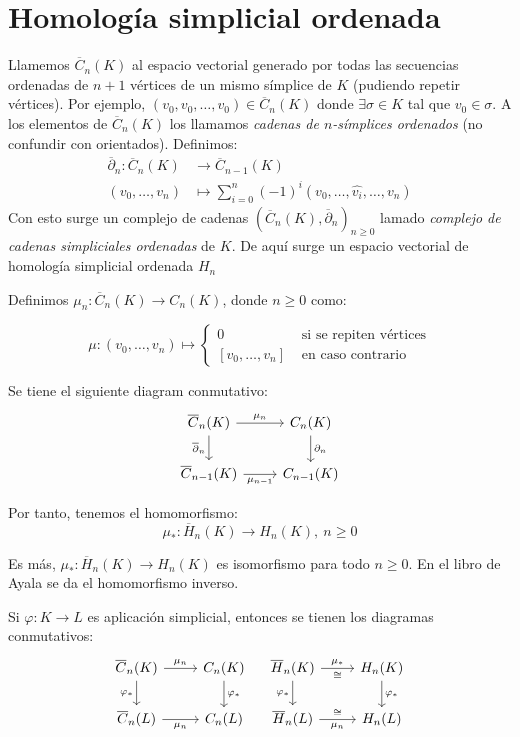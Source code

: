 \documentclass[HS.tex]{subfiles}
\begin{document}
\section{Homología simplicial ordenada}

Llamemos $\overline{C}_n(K)$ al espacio vectorial generado por todas las secuencias ordenadas de $n+1$ vértices de un mismo símplice de $K$ (pudiendo repetir vértices).
Por ejemplo, $(v_0,v_0,\dots,v_0) \in \overline{C}_n(K)$ donde $\exists \sigma \in K$ tal que $v_0 \in \sigma$.
A los elementos de $\overline{C}_n(K)$ los llamamos \emph{cadenas de $n$-símplices ordenados} (no confundir con orientados).
Definimos:
\begin{align*}
	\overline{\partial}_n \colon \overline{C}_n(K) & \to \overline{C}_{n-1}(K)\\
	(v_0,\dots,v_n) & \mapsto \sum_{i=0}^n (-1)^i(v_0,\dots,\widehat{v_i},\dots,v_n)
\end{align*}
Con esto surge un complejo de cadenas $(\overline{C}_n(K), \overline{\partial}_n)_{n \geq 0}$ lamado \emph{complejo de cadenas simpliciales ordenadas} de $K$.
De aquí surge un espacio vectorial de homología simplicial ordenada $H_n$

Definimos $\mu_n \colon \overline{C}_n(K) \to C_n(K)$, donde $n \geq 0$ como:

\[ \mu \colon (v_0,\dots,v_n) \mapsto \begin{cases}0 & \text{ si se repiten vértices}\\ [v_0,\dots,v_n] & \text{ en caso contrario}\end{cases}\]

\begin{propi}\mbox{}
Se tiene el siguiente diagram conmutativo:
\[\begin{tikzcd}{\overline{C}_n(K)} \arrow[r,"\mu_n"] \arrow[d,"\overline{\partial}_n" left] & {C_n(K)} \arrow[d,"\partial_n"]\\
{\overline{C}_{n-1}(K)} \arrow[r,"\mu_{n-1}" below] & C_{n-1}(K)
\end{tikzcd}\]

Por tanto, tenemos el homomorfismo:
\[ \mu_* \colon \overline{H}_n(K) \to H_n(K),\ n\geq 0\]

Es más, $\mu_* \colon \overline{H}_n(K) \to H_n(K)$ es isomorfismo para todo $n \geq 0$.
En el libro de Ayala se da el homomorfismo inverso.
\end{propi}

\begin{propi}
Si $\varphi \colon K \to L$ es aplicación simplicial, entonces se tienen los diagramas conmutativos:
\[\begin{tikzcd}{\overline{C}_n(K)} \arrow[r,"\mu_n"] \arrow[d,"\varphi_*" left] & {C_n(K)} \arrow[d,"\varphi_*"]\\
{\overline{C}_n(L)} \arrow[r,"\mu_n" below] & C_n(L)
\end{tikzcd} \quad \begin{tikzcd}{\overline{H}_n(K)} \arrow[r,"\mu_*","\cong" below] \arrow[d,"\varphi_*" left] & {H_n(K)} \arrow[d,"\varphi_*"]\\
{\overline{H}_n(L)} \arrow[r,"\mu_n" below,"\cong" above] & H_n(L)
\end{tikzcd}\]
\end{propi}
\end{document}
